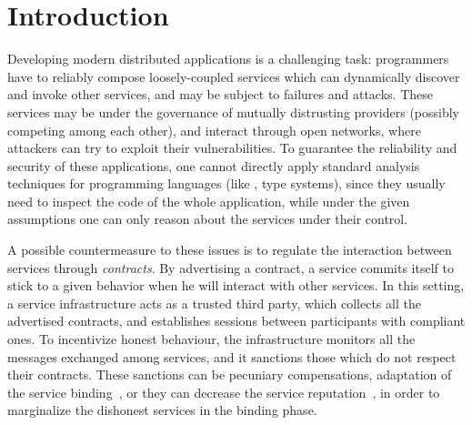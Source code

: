 \section{Introduction}


Developing modern distributed applications 
is a challenging task:
programmers have to reliably compose loosely-coupled services
which can dynamically discover and invoke other services,
and may be subject to failures and attacks.
These services may be under the governance of mutually distrusting providers 
(possibly competing among each other), 
and interact through open networks, %
where attackers can try to exploit their vulnerabilities. %
%
To guarantee the reliability and security of these applications,
one cannot directly apply standard analysis techniques for programming languages
(like \eg, type systems), 
since they usually need to inspect the code of the whole application,
while under the given assumptions one can only %
reason about the services under their control. %

A possible countermeasure to these issues is to regulate the interaction
between services through \emph{contracts}.
By advertising a contract, a service commits itself
to stick to a given behavior when he will interact with other services.
In this setting, a service infrastructure acts as a trusted third party, 
which collects all the advertised contracts, and establishes sessions
between participants with compliant ones. %
To incentivize honest behaviour,
the infrastructure monitors all the messages exchanged among services,
and it sanctions those which do not respect their contracts.
These sanctions can be pecuniary compensations,
adaptation of the service binding~\cite{Mukhija2007qos},
or they can decrease the service reputation~\cite{CO2middleware},
in order to marginalize the dishonest services in the binding phase.



